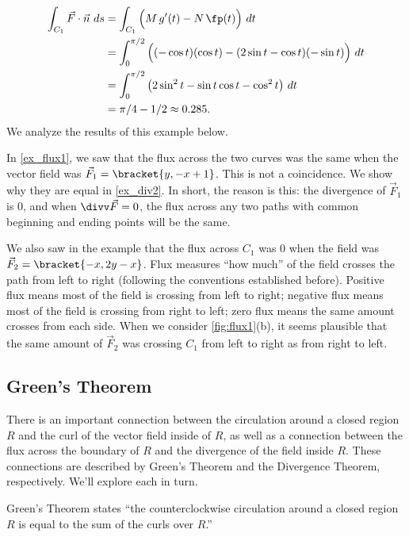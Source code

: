 {\begin{align*}
	\int_{C_1} \vec F\cdot \vec n\ ds
	& = \int_{C_1} \Big(M\,g'(t) - N\,\fp(t)\Big)\ dt\\
	&= \int_0^{\pi/2}\Big((-\cos t)(\cos t) - (2\sin t-\cos t)(-\sin t)\Big)\ dt\\
	&= \int_0^{\pi/2} \big(2\sin^2 t-\sin t\cos t-\cos^2t\big)\ dt\\
	&=\pi/4 - 1/2\approx 0.285.
\end{align*}
We analyze the results of this example below.}

In \autoref{ex_flux1}, we saw that the flux across the two curves was the same when the vector field was $\vec F_1 =\bracket{y, -x+1}$. This is not a coincidence. We show why they are equal in \autoref{ex_div2}. In short, the reason is this: the divergence of $\vec F_1$ is 0, and when $\divv \vec F = 0$, the flux across any two paths with common beginning and ending points will be the same.

We also saw in the example that the flux across $C_1$ was 0 when the field was $\vec F_2 =\bracket{-x, 2y-x}$. Flux measures ``how much'' of the field crosses the path from left to right (following the conventions established before). Positive flux means most of the field is crossing from left to right; negative flux means most of the field is crossing from right to left; zero flux means the same amount crosses from each side. When we consider \autoref{fig:flux1}(b), it seems plausible that the same amount of $\vec F_2$ was crossing $C_1$ from left to right as from right to left.

%

\subsection{Green's Theorem}

There is an important connection between the circulation around a closed region $R$ and the curl of the vector field inside of $R$, as well as a connection between the flux across the boundary of $R$ and the divergence of the field inside $R$. These connections are described by Green's Theorem and the Divergence Theorem, respectively. We'll explore each in turn.

Green's Theorem states ``the counterclockwise circulation around a closed region $R$ is equal to the sum of the curls over $R$.''

